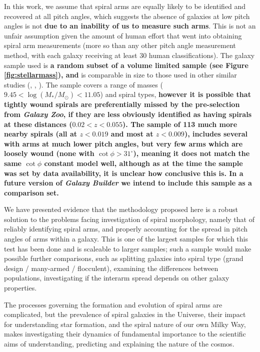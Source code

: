 In this work, we assume that spiral arms are equally likely to be identified and recovered at all pitch angles, which suggests the absence of galaxies at low pitch angles is not {\bf due to an inability of us to measure such arms}. This is not an unfair assumption given the amount of human effort that went into obtaining spiral arm measurements (more so than any other pitch angle measurement method, with each galaxy receiving at least 30 human classifications). The galaxy sample used is {\bf a random subset of a volume limited sample (see Figure \ref{fig:stellarmass}), and} is comparable in size to those used in other similar studies (\citealt{2013MNRAS.436.1074S}, \citealt{2019ApJ...871..194Y}, \citealt{2019arXiv190910291P}). The sample covers a range of masses ($9.45 < \log(M_* / M_\odot) < 11.05$) and spiral types, {\bf however it is possible that tightly wound spirals are preferentially missed by the pre-selection from {\it Galaxy Zoo}, if they are less obviously identified as having spirals at these distances ($0.02<z<0.055$). The \citet{1981AJ.....86.1847K} sample of 113 much more nearby spirals (all at $z<0.019$ and most at $z<0.009$), includes several with arms at much lower pitch angles, but very few arms which are loosely wound (none with $\cot \phi > 31^\circ$), meaning it does not match the same $\cot \phi$ constant model well, although as at the time the sample was set by data availability, it is unclear how conclusive this is. In a future version of {\it Galaxy Builder} we intend to include this sample as a comparison set.}

We have presented evidence that the methodology proposed here is a robust solution to the problems facing investigation of spiral morphology, namely that of reliably identifying spiral arms, and properly accounting for the spread in pitch angles of arms within a galaxy. This is one of the largest samples for which this test has been done and is scaleable to larger samples; such a sample would make possible further comparisons, such as splitting galaxies into spiral type (grand design / many-armed / flocculent), examining the differences between populations, investigating if the interarm spread depends on other galaxy properties.

The processes governing the formation and evolution of spiral arms are complicated, but the prevalence of spiral galaxies in the Universe, their impact for understanding star formation, and the spiral nature of our own Milky Way, makes investigating their dynamics of fundamental importance to the scientific aims of understanding, predicting and explaining the nature of the cosmos.
